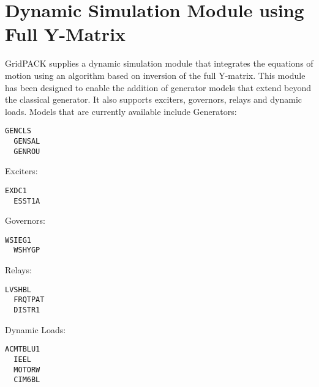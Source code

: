 \section{Dynamic Simulation Module using Full Y-Matrix}

GridPACK supplies a dynamic simulation module that integrates the equations of motion using an algorithm based on inversion of the full Y-matrix. This module has been designed to enable the addition of generator models that extend beyond the classical generator. It also supports exciters, governors, relays and dynamic loads. Models that are currently available include
Generators:

{
\color{red}
\begin{Verbatim}[fontseries=b]
  GENCLS
  GENSAL
  GENROU
\end{Verbatim}
}

Exciters:

{
\color{red}
\begin{Verbatim}[fontseries=b]
  EXDC1
  ESST1A
\end{Verbatim}
}

Governors:

{
\color{red}
\begin{Verbatim}[fontseries=b]
  WSIEG1
  WSHYGP
\end{Verbatim}
}

Relays:

{
\color{red}
\begin{Verbatim}[fontseries=b]
  LVSHBL
  FRQTPAT
  DISTR1
\end{Verbatim}
}

Dynamic Loads:

{
\color{red}
\begin{Verbatim}[fontseries=b]
  ACMTBLU1
  IEEL
  MOTORW
  CIM6BL
\end{Verbatim}
}

